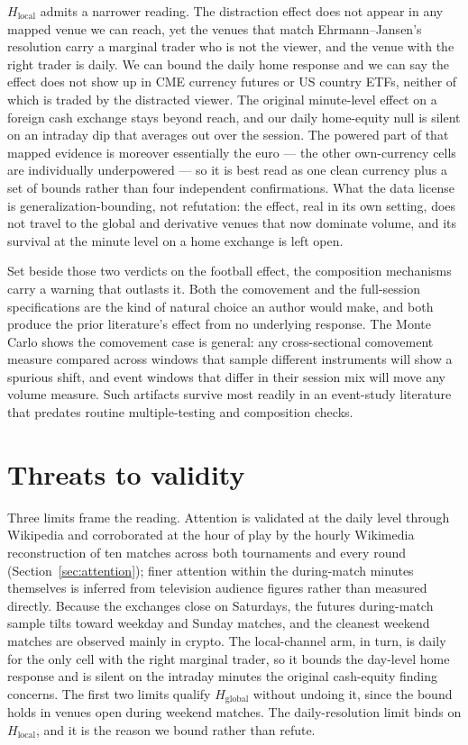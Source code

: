 \documentclass[12pt]{article}
\begin{document}
$H_{\text{local}}$ admits a narrower reading. The distraction effect does not appear in any mapped venue we can reach, yet the venues that match Ehrmann--Jansen's resolution carry a marginal trader who is not the viewer, and the venue with the right trader is daily. We can bound the daily home response and we can say the effect does not show up in CME currency futures or US country ETFs, neither of which is traded by the distracted viewer. The original minute-level effect on a foreign cash exchange stays beyond reach, and our daily home-equity null is silent on an intraday dip that averages out over the session. The powered part of that mapped evidence is moreover essentially the euro --- the other own-currency cells are individually underpowered --- so it is best read as one clean currency plus a set of bounds rather than four independent confirmations. What the data license is generalization-bounding, not refutation: the effect, real in its own setting, does not travel to the global and derivative venues that now dominate volume, and its survival at the minute level on a home exchange is left open.

Set beside those two verdicts on the football effect, the composition mechanisms carry a warning that outlasts it. Both the comovement and the full-session specifications are the kind of natural choice an author would make, and both produce the prior literature's effect from no underlying response. The Monte Carlo shows the comovement case is general: any cross-sectional comovement measure compared across windows that sample different instruments will show a spurious shift, and event windows that differ in their session mix will move any volume measure. Such artifacts survive most readily in an event-study literature that predates routine multiple-testing and composition checks.

\section{Threats to validity}\label{sec:limits}
Three limits frame the reading. Attention is validated at the daily level through Wikipedia and corroborated at the hour of play by the hourly Wikimedia reconstruction of ten matches across both tournaments and every round (Section~\ref{sec:attention}); finer attention within the during-match minutes themselves is inferred from television audience figures rather than measured directly. Because the exchanges close on Saturdays, the futures during-match sample tilts toward weekday and Sunday matches, and the cleanest weekend matches are observed mainly in crypto. The local-channel arm, in turn, is daily for the only cell with the right marginal trader, so it bounds the day-level home response and is silent on the intraday minutes the original cash-equity finding concerns. The first two limits qualify $H_{\text{global}}$ without undoing it, since the bound holds in venues open during weekend matches. The daily-resolution limit binds on $H_{\text{local}}$, and it is the reason we bound rather than refute.
\end{document}
